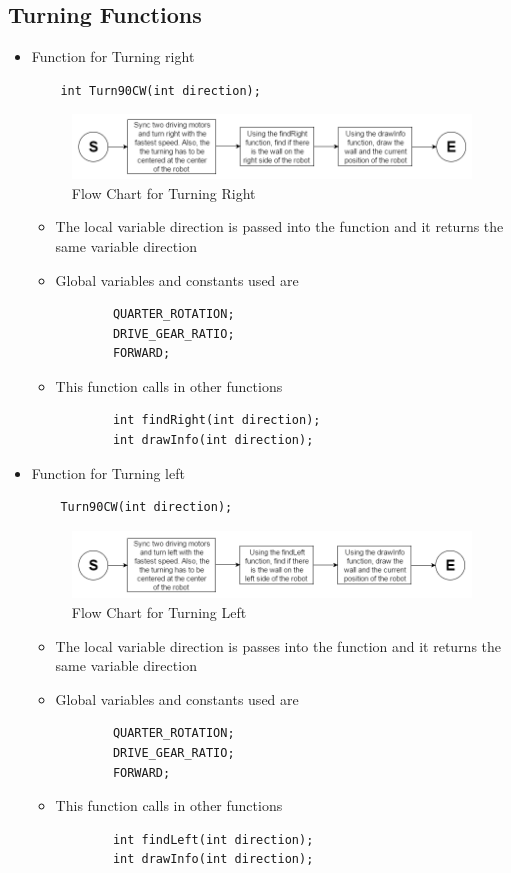 \documentclass[11pt]{article}
\begin{document}

\subsection{Turning Functions}
\begin{itemize}
\item Function for Turning right
\begin{verbatim}
	int Turn90CW(int direction);
\end{verbatim}
\begin{figure}[htp]
\centering
\includegraphics[scale=0.6]{images/Software_Flowchart/Turning_Right.png}
\caption{Flow Chart for Turning Right}
\label{}
\end{figure}
	\begin{itemize}
	\item The local variable direction is passed into the function and it returns the same variable direction
	\item Global variables and constants used are
	\begin{verbatim}
		QUARTER_ROTATION;
		DRIVE_GEAR_RATIO;
		FORWARD;
	\end{verbatim}
	\item This function calls in other functions
	\begin{verbatim}
		int findRight(int direction);
		int drawInfo(int direction);
	\end{verbatim}
	\end{itemize}
\item Function for Turning left 
\begin{verbatim}
	Turn90CW(int direction);
\end{verbatim}
\begin{figure}[htp]
\centering
\includegraphics[scale=0.60]{images/Software_Flowchart/Turning_Left.png}
\caption{Flow Chart for Turning Left}
\label{}
\end{figure}
	\begin{itemize}
	\item The local variable direction is passes into the function and it returns the same variable direction
	\item Global variables and constants used are
	\begin{verbatim}
		QUARTER_ROTATION;
		DRIVE_GEAR_RATIO;
		FORWARD;
	\end{verbatim}
	\item This function calls in other functions
	\begin{verbatim}
		int findLeft(int direction);
		int drawInfo(int direction);
	\end{verbatim}
	\end{itemize}
\end{itemize}
\newpage
\end{document}
